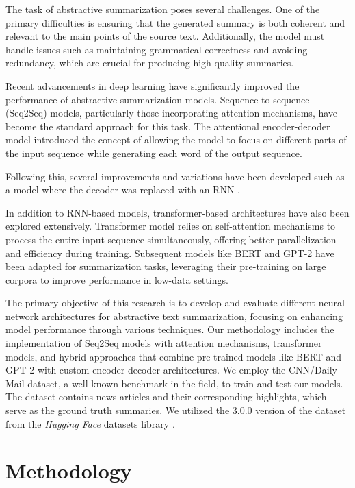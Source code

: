 \documentclass[a4paper, 11pt]{article}
\begin{document}
The task of abstractive summarization poses several challenges. One of the primary difficulties is ensuring that the generated summary is both coherent and relevant to the main points of the source text. Additionally, the model must handle issues such as maintaining grammatical correctness and avoiding redundancy, which are crucial for producing high-quality summaries.

Recent advancements in deep learning have significantly improved the performance of abstractive summarization models. Sequence-to-sequence (Seq2Seq) models, particularly those incorporating attention mechanisms, have become the standard approach for this task. The attentional encoder-decoder model \cite{bahdanau2014neural} introduced the concept of allowing the model to focus on different parts of the input sequence while generating each word of the output sequence.

Following this, several improvements and variations have been developed such as a model where the decoder was replaced with an RNN \cite{Chopra2016AbstractiveSS}. 

In addition to RNN-based models, transformer-based architectures have also been explored extensively. Transformer model \cite{transformer} relies on self-attention mechanisms to process the entire input sequence simultaneously, offering better parallelization and efficiency during training. Subsequent models like BERT \cite{devlin2018bert} and GPT-2 \cite{radford2019language} have been adapted for summarization tasks, leveraging their pre-training on large corpora to improve performance in low-data settings.

The primary objective of this research is to develop and evaluate different neural network architectures for abstractive text summarization, focusing on enhancing model performance through various techniques. Our methodology includes the implementation of Seq2Seq models with attention mechanisms, transformer models, and hybrid approaches that combine pre-trained models like BERT and GPT-2 with custom encoder-decoder architectures. We employ the CNN/Daily Mail dataset, a well-known benchmark in the field, to train and test our models. The dataset contains news articles and their corresponding highlights, which serve as the ground truth summaries. We utilized the 3.0.0 version of the dataset from the \textit{Hugging Face} datasets library \cite{huggingface_cnn_dailymail}.


\newpage
\setcounter{page}{1}
\section{Methodology}
\end{document}
